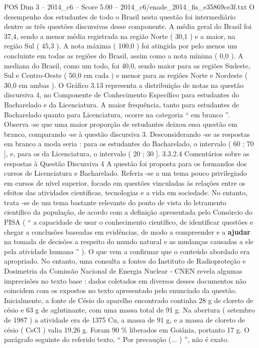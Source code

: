 \begin{textsample}{POS Dim 3 – 2014\_c6 – Score 5.00 – 2014\_c6/enade\_2014\_fis\_e35869ce3f.txt}
O desempenho dos estudantes de todo o Brasil nesta questão foi intermediário dentre as três questões discursivas desse componente.
A média geral do Brasil foi 37,4, sendo a menor média registrada na região Norte ( 30,1 ) e a maior, na região Sul ( 45,3 ).
A nota máxima ( 100,0 ) foi atingida por pelo menos um concluinte em todas as regiões do Brasil, assim como a nota mínima ( 0,0 ).
A mediana do Brasil, como um todo, foi 40,0, sendo maior para as regiões Sudeste, Sul e Centro-Oeste ( 50,0 em cada ) e menor para as regiões Norte e Nordeste ( 30,0 em ambas ).
O Gráfico 3.13 representa a distribuição de notas na questão discursiva 4, no Componente de Conhecimento Específico para estudantes do Bacharelado e da Licenciatura.
A maior frequência, tanto para estudantes de Bacharelado quanto para Licenciatura, ocorre na categoria “ em branco ”.
Observa -se que uma maior proporção de estudantes deixou essa questão em branco, comparando -se à questão discursiva 3.
Desconsiderando -se as respostas em branco a moda seria : para os estudantes do Bacharelado, o intervalo ( 60 ; 70 ], e, para os da Licenciatura, o intervalo ( 20 ; 30 ]. 3.3.2.4 Comentários sobre as respostas à Questão Discursiva 4 A questão foi proposta para os formandos dos cursos de Licenciatura e Bacharelado.
Referia -se a um tema pouco privilegiado em cursos de nível superior, focado em questões vinculadas às relações entre os efeitos das atividades científicas, tecnologias e a vida em sociedade.
No entanto, trata -se de um tema bastante relevante do ponto de vista do letramento científico da população, de acordo com a definição apresentada pelo Consórcio do PISA ( “ a capacidade de usar o conhecimento científico, de identificar questões e chegar a conclusões baseadas em evidências, de modo a compreender e a \textbf{ajudar} na tomada de decisões a respeito do mundo natural e as mudanças causadas a ele pela atividade humana ” ).
O que vem a confirmar que o conteúdo abordado era apropriado.
No entanto, uma consulta a fontes do Instituto de Radioproteção e Dosimetria da Comissão Nacional de Energia Nuclear - CNEN revela algumas imprecisões no texto base : dados coletados em diversos desses documentos não coincidem com os expostos no texto apresentado pelo enunciado da questão.
Inicialmente, a fonte de Césio do aparelho encontrado continha 28 g de cloreto de césio e 63 g de aglutinante, com uma massa total de 91 g.
Na abertura ( setembro de 1987 ) a atividade era de 1375 Cu, a massa de 91 g, e a massa de cloreto de césio ( CsCl ) valia 19,26 g.
Foram 90 \% liberados em Goiânia, portanto 17 g.
O parágrafo seguinte do referido texto, “ Por precaução (... ) ”, não é exato.

\end{textsample}
